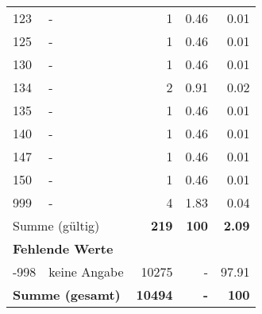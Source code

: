 \begin{longtable}{lXrrr}
        123 & \multicolumn{1}{X}{-} & %
          \num{1} &
          \num[round-mode=places,round-precision=2]{0,46} &
          \num[round-mode=places,round-precision=2]{0,01} \\

        125 & \multicolumn{1}{X}{-} & %
          \num{1} &
          \num[round-mode=places,round-precision=2]{0,46} &
          \num[round-mode=places,round-precision=2]{0,01} \\

        130 & \multicolumn{1}{X}{-} & %
          \num{1} &
          \num[round-mode=places,round-precision=2]{0,46} &
          \num[round-mode=places,round-precision=2]{0,01} \\

        134 & \multicolumn{1}{X}{-} & %
          \num{2} &
          \num[round-mode=places,round-precision=2]{0,91} &
          \num[round-mode=places,round-precision=2]{0,02} \\

        135 & \multicolumn{1}{X}{-} & %
          \num{1} &
          \num[round-mode=places,round-precision=2]{0,46} &
          \num[round-mode=places,round-precision=2]{0,01} \\

        140 & \multicolumn{1}{X}{-} & %
          \num{1} &
          \num[round-mode=places,round-precision=2]{0,46} &
          \num[round-mode=places,round-precision=2]{0,01} \\

        147 & \multicolumn{1}{X}{-} & %
          \num{1} &
          \num[round-mode=places,round-precision=2]{0,46} &
          \num[round-mode=places,round-precision=2]{0,01} \\

        150 & \multicolumn{1}{X}{-} & %
          \num{1} &
          \num[round-mode=places,round-precision=2]{0,46} &
          \num[round-mode=places,round-precision=2]{0,01} \\

        999 & \multicolumn{1}{X}{-} & %
          \num{4} &
          \num[round-mode=places,round-precision=2]{1,83} &
          \num[round-mode=places,round-precision=2]{0,04} \\

     \midrule
     \multicolumn{2}{l}{Summe (gültig)} &
       \textbf{\num{219}} &
     \textbf{100} &
       \textbf{\num[round-mode=places,round-precision=2]{2,09}} \\
     \multicolumn{5}{l}{\textbf{Fehlende Werte}}\\
       -998 &
       keine Angabe &
         \num{10275} &
        - &
         \num[round-mode=places,round-precision=2]{97,91} \\
     \midrule
     \multicolumn{2}{l}{\textbf{Summe (gesamt)}} &
          \textbf{\num{10494}} &
        \textbf{-} &
        \textbf{100} \\
     \bottomrule
     \end{longtable}
     
